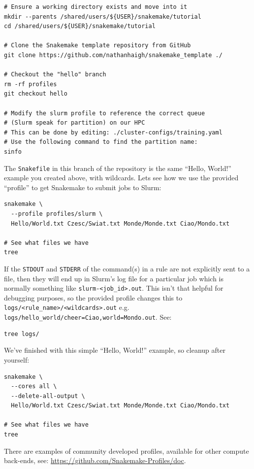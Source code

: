\begin{lstlisting}
# Ensure a working directory exists and move into it
mkdir --parents /shared/users/${USER}/snakemake/tutorial
cd /shared/users/${USER}/snakemake/tutorial

# Clone the Snakemake template repository from GitHub
git clone https://github.com/nathanhaigh/snakemake_template ./

# Checkout the "hello" branch
rm -rf profiles
git checkout hello

# Modify the slurm profile to reference the correct queue
# (Slurm speak for partition) on our HPC
# This can be done by editing: ./cluster-configs/training.yaml
# Use the following command to find the partition name:
sinfo
\end{lstlisting}

The \texttt{Snakefile} in this branch of the repository is the same ``Hello, World!'' example you created above, with wildcards.
Lets see how we use the provided ``profile'' to get Snakemake to submit jobs to Slurm:

\begin{lstlisting}
snakemake \
  --profile profiles/slurm \
  Hello/World.txt Czesc/Swiat.txt Monde/Monde.txt Ciao/Mondo.txt

# See what files we have
tree
\end{lstlisting}

If the \texttt{STDOUT} and \texttt{STDERR} of the command(s) in a rule are not explicitly sent to a file, then they will end up in Slurm's log file for a particular job which is normally something like \texttt{slurm-<job\_id>.out}.
This isn't that helpful for debugging purposes, so the provided profile changes this to \texttt{logs/<rule\_name>/<wildcards>.out} e.g. \texttt{logs/hello\_world/cheer=Ciao,world=Mondo.out}. See:

\begin{lstlisting}
tree logs/
\end{lstlisting}

We've finished with this simple ``Hello, World!'' example, so cleanup after yourself:

\begin{lstlisting}
snakemake \
  --cores all \
  --delete-all-output \
  Hello/World.txt Czesc/Swiat.txt Monde/Monde.txt Ciao/Mondo.txt

# See what files we have
tree
\end{lstlisting}

\begin{warning}

There are examples of community developed profiles, available for other compute back-ends, see: \url{https://github.com/Snakemake-Profiles/doc}.

\end{warning}

